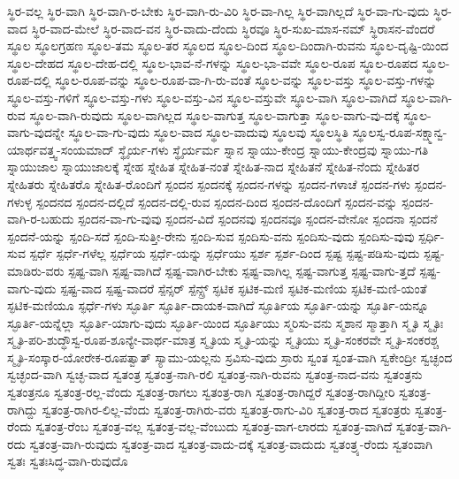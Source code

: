 {ಸ್ಥಿರ-ವಲ್ಲ
ಸ್ಥಿರ-ವಾಗಿ
ಸ್ಥಿರ-ವಾಗಿ-ರ-ಬೇಕು
ಸ್ಥಿರ-ವಾಗಿ-ರು-ವಿರಿ
ಸ್ಥಿರ-ವಾ-ಗಿಲ್ಲ
ಸ್ಥಿರ-ವಾಗಿಲ್ಲದೆ
ಸ್ಥಿರ-ವಾ-ಗು-ವುದು
ಸ್ಥಿರ-ವಾದ
ಸ್ಥಿರ-ವಾದ-ಮೇಲೆ
ಸ್ಥಿರ-ವಾದ-ವನ
ಸ್ಥಿರ-ವಾದು-ದೆಂದು
ಸ್ಥಿರವೂ
ಸ್ಥಿರ-ಸುಖ-ಮಾಸ-ನಮ್
ಸ್ಥಿರಾಸನ-ವೆಂದರೆ
ಸ್ಥೂಲ
ಸ್ಥೂಲಗ್ರಹಣ
ಸ್ಥೂಲ-ತಮ
ಸ್ಥೂಲ-ತರ
ಸ್ಥೂಲದ
ಸ್ಥೂಲ-ದಿಂದ
ಸ್ಥೂಲ-ದಿಂದಾಗಿ-ರುವನು
ಸ್ಥೂಲ-ದೃಷ್ಟಿ-ಯಿಂದ
ಸ್ಥೂಲ-ದೇಹದ
ಸ್ಥೂಲ-ದೇಹ-ದಲ್ಲಿ
ಸ್ಥೂಲ-ಭಾವ-ನೆ-ಗಳನ್ನು
ಸ್ಥೂಲ-ಭಾ-ವವೇ
ಸ್ಥೂಲ-ರೂಪ
ಸ್ಥೂಲ-ರೂಪದ
ಸ್ಥೂಲ-ರೂಪ-ದಲ್ಲಿ
ಸ್ಥೂಲ-ರೂಪ-ವನ್ನು
ಸ್ಥೂಲ-ರೂಪ-ವಾ-ಗಿ-ರು-ವಂತೆ
ಸ್ಥೂಲ-ವನ್ನು
ಸ್ಥೂಲ-ವಸ್ತು
ಸ್ಥೂಲ-ವಸ್ತು-ಗಳನ್ನು
ಸ್ಥೂಲ-ವಸ್ತು-ಗಳಿಗೆ
ಸ್ಥೂಲ-ವಸ್ತು-ಗಳು
ಸ್ಥೂಲ-ವಸ್ತು-ವಿನ
ಸ್ಥೂಲ-ವಸ್ತುವೇ
ಸ್ಥೂಲ-ವಾಗಿ
ಸ್ಥೂಲ-ವಾಗಿದೆ
ಸ್ಥೂಲ-ವಾಗಿ-ರುವ
ಸ್ಥೂಲ-ವಾಗಿ-ರುವುದು
ಸ್ಥೂಲ-ವಾಗಿಲ್ಲದ
ಸ್ಥೂಲ-ವಾಗುತ್ತ
ಸ್ಥೂಲ-ವಾಗುತ್ತಾ
ಸ್ಥೂಲ-ವಾಗು-ವು-ದಕ್ಕೆ
ಸ್ಥೂಲ-ವಾಗು-ವುದನ್ನೇ
ಸ್ಥೂಲ-ವಾ-ಗು-ವುದು
ಸ್ಥೂಲ-ವಾದ
ಸ್ಥೂಲ-ವಾದುವು
ಸ್ಥೂಲವು
ಸ್ಥೂಲಸ್ಥಿತಿ
ಸ್ಥೂಲಸ್ವ-ರೂಪ-ಸಕ್ಷ್ಮಾನ್ವ-ಯಾರ್ಥವತ್ತ್ವ-ಸಂಯಮಾದ್
ಸ್ಥೈರ್ಯ-ಗಳು
ಸ್ಥೈರ್ಯರ್ಮ
ಸ್ನಾನ
ಸ್ನಾಯು-ಕೇಂದ್ರ
ಸ್ನಾಯು-ಕೇಂದ್ರವು
ಸ್ನಾಯು-ಗತಿ
ಸ್ನಾಯುಜಾಲ
ಸ್ನಾಯುಜಾಲಕ್ಕೆ
ಸ್ನೇಹ
ಸ್ನೇಹಿತ
ಸ್ನೇಹಿತ-ನಂತೆ
ಸ್ನೇಹಿತ-ನಾದ
ಸ್ನೇಹಿತನೆ
ಸ್ನೇಹಿತ-ನೆಂದು
ಸ್ನೇಹಿತರ
ಸ್ನೇಹಿತರು
ಸ್ನೇಹಿತರೊ
ಸ್ನೇಹಿತ-ರೊಂದಿಗೆ
ಸ್ಪಂದನ
ಸ್ಪಂದನಕ್ಕೆ
ಸ್ಪಂದನ-ಗಳನ್ನು
ಸ್ಪಂದನ-ಗಳಾಚೆ
ಸ್ಪಂದನ-ಗಳು
ಸ್ಪಂದನ-ಗಳುಳ್ಳ
ಸ್ಪಂದನದ
ಸ್ಪಂದನ-ದಲ್ಲಿದೆ
ಸ್ಪಂದನ-ದಲ್ಲಿ-ರುವ
ಸ್ಪಂದನ-ದಿಂದ
ಸ್ಪಂದನ-ದೊಂದಿಗೆ
ಸ್ಪಂದನ-ವನ್ನು
ಸ್ಪಂದನ-ವಾಗಿ-ರ-ಬಹುದು
ಸ್ಪಂದನ-ವಾ-ಗು-ವುವು
ಸ್ಪಂದನ-ವಿದೆ
ಸ್ಪಂದನವು
ಸ್ಪಂದನವೂ
ಸ್ಪಂದನ-ವೇನೋ
ಸ್ಪಂದನಾ
ಸ್ಪಂದನೆ
ಸ್ಪಂದನೆ-ಯನ್ನು
ಸ್ಪಂದಿ-ಸದೆ
ಸ್ಪಂದಿ-ಸುತ್ತೀ-ರೇನು
ಸ್ಪಂದಿ-ಸುವ
ಸ್ಪಂದಿಸು-ವನು
ಸ್ಪಂದಿಸು-ವುದು
ಸ್ಪಂದಿಸು-ವುವು
ಸ್ಪರ್ಧಿ-ಸುವ
ಸ್ಪರ್ಧೆ
ಸ್ಪರ್ಧೆ-ಗಳೆಲ್ಲ
ಸ್ಪರ್ಧೆಯ
ಸ್ಪರ್ಧೆ-ಯನ್ನು
ಸ್ಪರ್ಧೆಯು
ಸ್ಪರ್ಶ
ಸ್ಪರ್ಶ-ದಿಂದ
ಸ್ಪಷ್ಟ
ಸ್ಪಷ್ಟ-ಪಡಿಸು-ವುದು
ಸ್ಪಷ್ಟ-ಮಾಡಿರು-ವರು
ಸ್ಪಷ್ಟ-ವಾಗಿ
ಸ್ಪಷ್ಟ-ವಾಗಿದೆ
ಸ್ಪಷ್ಟ-ವಾಗಿರ-ಬೇಕು
ಸ್ಪಷ್ಟ-ವಾಗಿಲ್ಲ
ಸ್ಪಷ್ಟ-ವಾಗುತ್ತ
ಸ್ಪಷ್ಟ-ವಾಗು-ತ್ತದೆ
ಸ್ಪಷ್ಟ-ವಾಗು-ವುದು
ಸ್ಪಷ್ಟ-ವಾದ
ಸ್ಪಷ್ಟ-ವಾದರೆ
ಸ್ಪೆನ್ಸರ್
ಸ್ಪೆನ್ಸ್ರ್
ಸ್ಫಟಿಕ
ಸ್ಫಟಿಕ-ಮಣಿ
ಸ್ಫಟಿಕ-ಮಣಿಯ
ಸ್ಫಟಿಕ-ಮಣಿ-ಯಂತೆ
ಸ್ಫಟಿಕ-ಮಣಿಯೂ
ಸ್ಫರ್ಧೆ-ಗಳು
ಸ್ಫೂರ್ತಿ
ಸ್ಫೂರ್ತಿ-ದಾಯಕ-ವಾಗಿದೆ
ಸ್ಫೂರ್ತಿಯ
ಸ್ಫೂರ್ತಿ-ಯನ್ನು
ಸ್ಫೂರ್ತಿ-ಯನ್ನೂ
ಸ್ಫೂರ್ತಿ-ಯನ್ನೆಲ್ಲಾ
ಸ್ಫೂರ್ತಿ-ಯಾಗು-ವುದು
ಸ್ಫೂರ್ತಿ-ಯಿಂದ
ಸ್ಫೂರ್ತಿಯು
ಸ್ಮರಿಸು-ವನು
ಸ್ಮಶಾನ
ಸ್ಮಾತ್ತಾಗಿ
ಸ್ಮೃತಿ
ಸ್ಮೃತಿಃ
ಸ್ಮೃತಿ-ಪರಿ-ಶುದ್ಧೌಸ್ವ-ರೂಪ-ಶೂನ್ಯೇ-ವಾರ್ಥ-ಮಾತ್ರ
ಸ್ಮೃತಿಯ
ಸ್ಮೃತಿ-ಯನ್ನು
ಸ್ಮೃತಿಯು
ಸ್ಮೃತಿ-ಸಂಕರವೇ
ಸ್ಮೃತಿ-ಸಂಕರಶ್ಚ
ಸ್ಮೃತಿ-ಸಂಸ್ಕಾರ-ಯೋರೇಕ-ರೂಪತ್ವಾತ್
ಸ್ಯಾಮು-ಯಲ್ಲನು
ಸ್ರವಿಸು-ವುದು
ಸ್ರಾರು
ಸ್ವಂತ
ಸ್ವಂತ-ವಾಗಿ
ಸ್ವಕೇಂದ್ರೀ
ಸ್ವಚ್ಛಂದ
ಸ್ವಚ್ಛಂದ-ವಾಗಿ
ಸ್ವಚ್ಛ-ವಾದ
ಸ್ವತಂತ್ರ
ಸ್ವತಂತ್ರ-ನಾಗಿ-ರಲಿ
ಸ್ವತಂತ್ರ-ನಾಗಿ-ರುವನು
ಸ್ವತಂತ್ರ-ನಾದ-ವನು
ಸ್ವತಂತ್ರನು
ಸ್ವತಂತ್ರನೂ
ಸ್ವತಂತ್ರ-ರಲ್ಲ-ವೆಂದು
ಸ್ವತಂತ್ರ-ರಾಗಲು
ಸ್ವತಂತ್ರ-ರಾಗಿ
ಸ್ವತಂತ್ರ-ರಾಗಿದ್ದರೆ
ಸ್ವತಂತ್ರ-ರಾಗಿದ್ದೀರಿ
ಸ್ವತಂತ್ರ-ರಾಗಿದ್ದು
ಸ್ವತಂತ್ರ-ರಾಗಿರ-ಲಿಲ್ಲ-ವೆಂದು
ಸ್ವತಂತ್ರ-ರಾಗಿರು-ವರು
ಸ್ವತಂತ್ರ-ರಾಗು-ವಿರಿ
ಸ್ವತಂತ್ರ-ರಾದ
ಸ್ವತಂತ್ರರು
ಸ್ವತಂತ್ರ-ರೆಂದು
ಸ್ವತಂತ್ರ-ರೆಂಬ
ಸ್ವತಂತ್ರ-ವಲ್ಲ
ಸ್ವತಂತ್ರ-ವಲ್ಲ-ವೆಂಬುದು
ಸ್ವತಂತ್ರ-ವಾಗ-ಲಾರದು
ಸ್ವತಂತ್ರ-ವಾಗಿದೆ
ಸ್ವತಂತ್ರ-ವಾಗಿ-ರದು
ಸ್ವತಂತ್ರ-ವಾಗಿ-ರುವುದು
ಸ್ವತಂತ್ರ-ವಾದ
ಸ್ವತಂತ್ರ-ವಾದು-ದಕ್ಕೆ
ಸ್ವತಂತ್ರ-ವಾದುದು
ಸ್ವತಂತ್ರ್ಯ-ರೆಂದು
ಸ್ವತಂವಾಗಿ
ಸ್ವತಃ
ಸ್ವತಃಸಿದ್ಧ-ವಾಗಿ-ರುವುದೊ
}
